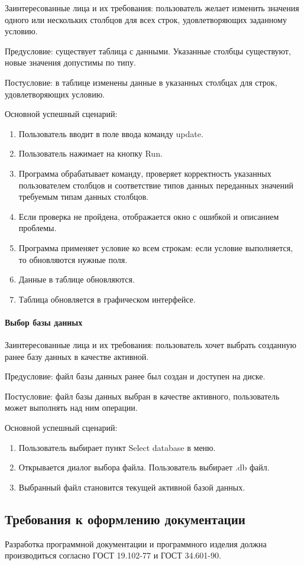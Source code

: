 Заинтересованные лица и их требования: пользователь желает изменить значения одного или нескольких столбцов для всех строк, удовлетворяющих заданному условию.

Предусловие: существует таблица с данными. Указанные столбцы существуют, новые значения допустимы по типу.

Постусловие: в таблице изменены данные в указанных столбцах для строк, удовлетворяющих условию.

Основной успешный сценарий:
\begin{enumerate}
	\item Пользователь вводит в поле ввода команду update.
	\item Пользователь нажимает на кнопку Run.		
	\item Программа обрабатывает команду, проверяет корректность указанных пользователем столбцов и соответствие типов данных переданных значений требуемым типам данных столбцов.
	\item Если проверка не пройдена, отображается окно с ошибкой и описанием проблемы.
	\item Программа применяет условие ко всем строкам: если условие выполняется, то обновляются нужные поля.		
	\item Данные в таблице обновляются.
	\item Таблица обновляется в графическом интерфейсе.
\end{enumerate}

\paragraph{Выбор базы данных}

Заинтересованные лица и их требования: пользователь хочет выбрать созданную ранее базу данных в качестве активной.

Предусловие: файл базы данных ранее был создан и доступен на диске.

Постусловие: файл базы данных выбран в качестве активного, пользователь может выполнять над ним операции.

Основной успешный сценарий:
\begin{enumerate}
	\item Пользователь выбирает пункт Select database в меню.	
	\item Открывается диалог выбора файла. Пользователь выбирает .db файл.		
	\item Выбранный файл становится текущей активной базой данных.	
\end{enumerate}

\subsection{Требования к оформлению документации}

Разработка программной документации и программного изделия должна производиться согласно ГОСТ 19.102-77 и ГОСТ 34.601-90.